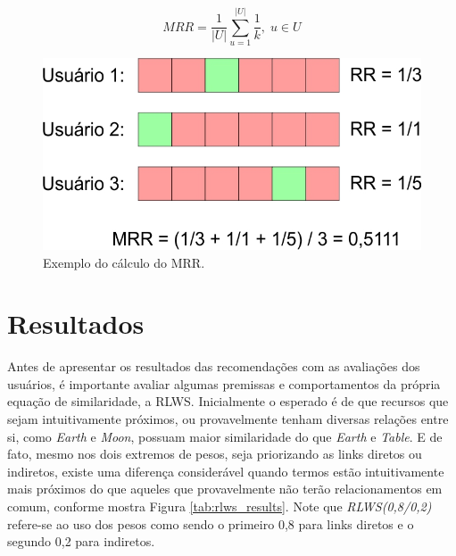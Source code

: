 \begin{equation}
	MRR = \frac{1}{|U|} \sum_{u=1}^{|U|} \frac{1}{k}, \; u \in U
\label{eq:mrr}
\end{equation}

\begin{figure}
	\centering
	\includegraphics[scale=0.4]{imagens/mrr_ex.jpg}
	\caption{Exemplo do cálculo do MRR.}
	\label{fig:mrr_ex}
\end{figure}

\section{Resultados}
\label{sec:results}

Antes de apresentar os resultados das recomendações com as avaliações dos usuários, é importante avaliar algumas premissas e comportamentos da própria equação de similaridade, a \ac{RLWS}. Inicialmente o esperado é de que recursos que sejam intuitivamente próximos, ou provavelmente tenham diversas relações entre si,  como \textit{Earth} e \textit{Moon}, possuam maior similaridade do que \textit{Earth} e \textit{Table}. E de fato, mesmo nos dois extremos de pesos, seja priorizando as links diretos ou indiretos, existe uma diferença considerável quando termos estão intuitivamente mais próximos do que aqueles que provavelmente não terão relacionamentos em comum, conforme mostra Figura \ref{tab:rlws_results}. Note que \textit{RLWS(0,8/0,2)} refere-se ao uso dos pesos como sendo o primeiro 0,8 para links diretos e o segundo 0,2 para indiretos.

